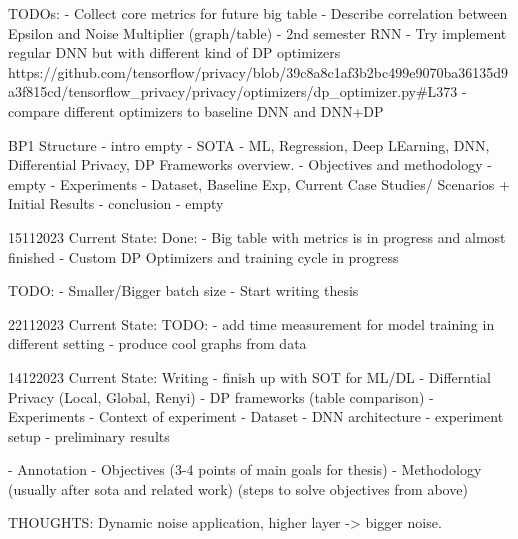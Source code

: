  TODOs:
 - Collect core metrics for future big table
 - Describe correlation between Epsilon and Noise Multiplier (graph/table)
 - 2nd semester RNN
 - Try implement regular DNN but with different kind of DP optimizers https://github.com/tensorflow/privacy/blob/39c8a8c1af3b2bc499e9070ba36135d9a3f815cd/tensorflow_privacy/privacy/optimizers/dp_optimizer.py#L373 
 - compare different optimizers to baseline DNN and DNN+DP


 BP1 Structure
 - intro empty
 - SOTA - ML, Regression, Deep LEarning, DNN, Differential Privacy, DP Frameworks overview.
 - Objectives and methodology - empty
 - Experiments - Dataset, Baseline Exp, Current Case Studies/ Scenarios + Initial Results
 - conclusion - empty


15112023 Current State:
Done:
- Big table with metrics is in progress and almost finished
- Custom DP Optimizers and training cycle in progress

TODO:
- Smaller/Bigger batch size
- Start writing thesis

22112023 Current State:
TODO:
- add time measurement for model training in different setting
- produce cool graphs from data 


14122023 Current State:
Writing
- finish up with SOT for ML/DL
- Differntial Privacy (Local, Global, Renyi)
- DP frameworks (table comparison)
- Experiments
    - Context of experiment
    - Dataset
    - DNN architecture
    - experiment setup
    - preliminary results

- Annotation
- Objectives (3-4 points of main goals for thesis)
- Methodology (usually after sota and related work) (steps to solve objectives from above)




 

 
 
 
THOUGHTS:
Dynamic noise application, higher layer -> bigger noise.
